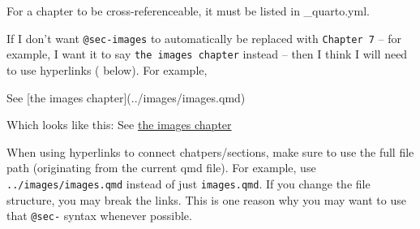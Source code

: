 \documentclass[
  letterpaper,
  DIV=11,
  numbers=noendperiod]{scrreprt}
\newenvironment{Shaded}{\begin{snugshade}}{\end{snugshade}}
\newcommand{\CommentTok}[1]{\textcolor[rgb]{0.37,0.37,0.37}{#1}}
\newcommand{\NormalTok}[1]{\textcolor[rgb]{0.00,0.23,0.31}{#1}}
\newcommand{\OtherTok}[1]{\textcolor[rgb]{0.00,0.23,0.31}{#1}}
\begin{document}
\begin{tcolorbox}[enhanced jigsaw, breakable, title=\textcolor{quarto-callout-important-color}{\faExclamation}\hspace{0.5em}{Chapter in \_quarto.yml}, bottomrule=.15mm, coltitle=black, left=2mm, colbacktitle=quarto-callout-important-color!10!white, colback=white, toprule=.15mm, leftrule=.75mm, arc=.35mm, colframe=quarto-callout-important-color-frame, bottomtitle=1mm, toptitle=1mm, opacityback=0, titlerule=0mm, opacitybacktitle=0.6, rightrule=.15mm]

For a chapter to be cross-referenceable, it must be listed in
\_quarto.yml.

\end{tcolorbox}

If I don't want \texttt{@sec-images} to automatically be replaced with
\texttt{Chapter\ 7} -- for example, I want it to say
\texttt{the\ images\ chapter} instead -- then I think I will need to use
hyperlinks ( below). For example,

\begin{Shaded}
\begin{Highlighting}[]
\NormalTok{See }\CommentTok{[}\OtherTok{the images chapter}\CommentTok{](../images/images.qmd)}
\end{Highlighting}
\end{Shaded}

Which looks like this: See \href{../images/images.qmd}{the images
chapter}

\begin{tcolorbox}[enhanced jigsaw, breakable, title=\textcolor{quarto-callout-important-color}{\faExclamation}\hspace{0.5em}{Hyperlink file paths}, bottomrule=.15mm, coltitle=black, left=2mm, colbacktitle=quarto-callout-important-color!10!white, colback=white, toprule=.15mm, leftrule=.75mm, arc=.35mm, colframe=quarto-callout-important-color-frame, bottomtitle=1mm, toptitle=1mm, opacityback=0, titlerule=0mm, opacitybacktitle=0.6, rightrule=.15mm]

When using hyperlinks to connect chatpers/sections, make sure to use the
full file path (originating from the current qmd file). For example, use
\texttt{../images/images.qmd} instead of just \texttt{images.qmd}. If
you change the file structure, you may break the links. This is one
reason why you may want to use that \texttt{@sec-} syntax whenever
possible.

\end{tcolorbox}
\end{document}
